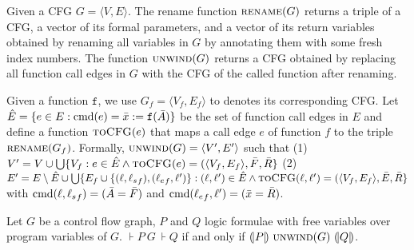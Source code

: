 Given a CFG $G=\langle
V, E \rangle$. The rename function $\textsc{rename}(G)$ returns a triple of a CFG, a vector of its formal parameters, and a vector of its return variables obtained by renaming all variables in $G$ by annotating them with some fresh index numbers. The function $\textsc{unwind}(G)$ returns a CFG obtained by replacing all function call edges in $G$ with the CFG of the called function after renaming. 

Given a function $\mathtt{f}$, we use $G_f=\langle
V_f, E_f \rangle$ to denotes its corresponding CFG.
Let $\hat{E} =\{e\in E: \textmd{cmd} (e)= \bar{x}:=\mathtt{f}(\bar{A})\}$ be the set of function call edges in $E$ and define a function $\textsc{toCFG}(e)$ that maps a call edge $e$ of function $f$ to the triple $\textsc{rename}(G_f)$.
Formally, $\textsc{unwind}(G) = \langle V', E' \rangle$ such that (1) $V' = V\cup \bigcup\{V_f: e\in \hat{E} \wedge \textsc{toCFG}(e)= (\langle V_f, E_f \rangle, \bar{F}, \bar{R} \}$ (2) $E'= E \setminus \hat{E} \cup \bigcup\{E_f\cup\{(\ell, {\ell_s}_f),({\ell_e}_f, \ell')\}: (\ell, \ell')\in \hat{E} \wedge \textsc{toCFG}(\ell, \ell')= (\langle V_f, E_f \rangle, \bar{E}, \bar{R} \}$ with $\textmd{cmd} (\ell, {\ell_s}_f) = (\bar{A}=\bar{F})$ and $\textmd{cmd} ({\ell_e}_f, \ell') = (\bar{x}=\bar{R})$.




\begin{proposition}
  Let $G$ be a control flow graph, $P$ and $Q$ logic formulae with
  free variables over program variables of $G$. $\assert{P}\ G\ 
  \assert{Q}$ if and only if $\assert{P}\ \textsc{unwind} (G)\ \assert{Q}$.
\end{proposition}